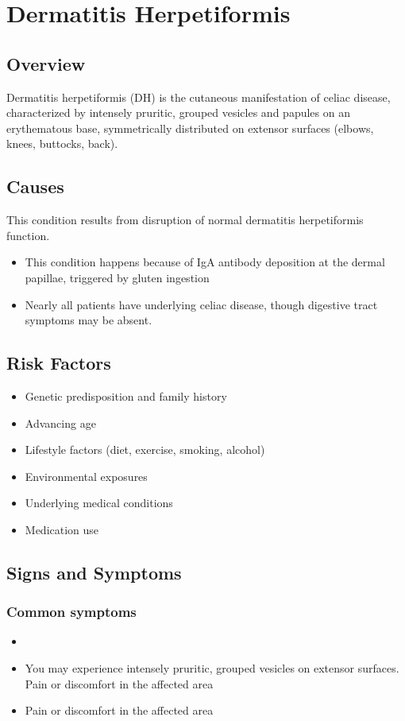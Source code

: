 \chapter{Dermatitis Herpetiformis}
\label{sec:Dermatitis Herpetiformis}

\section{Overview}
Dermatitis herpetiformis (DH) is the cutaneous manifestation of celiac disease, characterized by intensely pruritic, grouped vesicles and papules on an erythematous base, symmetrically distributed on extensor surfaces (elbows, knees, buttocks, back).
\section{Causes}
This condition results from disruption of normal dermatitis herpetiformis function.

\begin{itemize}[noitemsep]
  \item This condition happens because of IgA antibody deposition at the dermal papillae, triggered by gluten ingestion
  \item Nearly all patients have underlying celiac disease, though digestive tract symptoms may be absent.
\end{itemize}
\section{Risk Factors}


\begin{itemize}[noitemsep]
  \item Genetic predisposition and family history
  \item Advancing age
  \item Lifestyle factors (diet, exercise, smoking, alcohol)
  \item Environmental exposures
  \item Underlying medical conditions
  \item Medication use
\end{itemize}
\section{Signs and Symptoms}

\subsection{Common symptoms}
\begin{itemize}[noitemsep]
  \item \item You may experience intensely pruritic, grouped vesicles on extensor surfaces. Pain or discomfort in the affected area    \item Pain or discomfort in the affected area
  \end{itemize}

